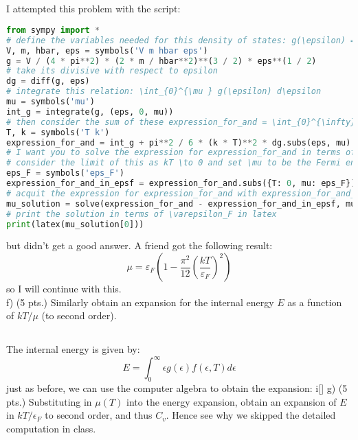 \documentclass[12pt]{article}
\begin{document}
\subsection{}
I attempted this problem with the script:
\begin{lstlisting}[language=Python]
from sympy import *
# define the variables needed for this density of states: g(\epsilon) = \frac{V}{4 \pi^2}\left(\frac{2 m}{\hbar^2}\right)^{3 / 2} \varepsilon^{1 / 2}
V, m, hbar, eps = symbols('V m hbar eps')
g = V / (4 * pi**2) * (2 * m / hbar**2)**(3 / 2) * eps**(1 / 2)
# take its divisive with respect to epsilon 
dg = diff(g, eps)
# integrate this relation: \int_{0}^{\mu } g(\epsilon) d\epsilon
mu = symbols('mu')
int_g = integrate(g, (eps, 0, mu))
# then consider the sum of these expression_for_and = \int_{0}^{\infty} g(\epsilon) f(\epsilon, T) d\epsilon = \int_{0}^{\mu } g(\epsilon) d\epsilon + \frac{\pi^2}{6} (kT)^2 g^{\prime}(\mu) + \ldots
T, k = symbols('T k')
expression_for_and = int_g + pi**2 / 6 * (k * T)**2 * dg.subs(eps, mu)
# I want you to solve the expression for expression_for_and in terms of \mu
# consider the limit of this as kT \to 0 and set \mu to be the Fermi energy \varepsilon_F
eps_F = symbols('eps_F')
expression_for_and_in_epsf = expression_for_and.subs({T: 0, mu: eps_F})
# acquit the expression for expression_for_and with expression_for_and_in_epsf and solve for \mu
mu_solution = solve(expression_for_and - expression_for_and_in_epsf, mu)
# print the solution in terms of \varepsilon_F in latex
print(latex(mu_solution[0]))
\end{lstlisting}
but didn't get a good answer. A friend got the following result:
\begin{equation}
  \mu = \varepsilon_F \left( 1 - \frac{\pi^2}{12} \left(\frac{kT}{\varepsilon_F}\right)^2 \right)
\end{equation}
so I will continue with this.\\
f) (5 pts.) Similarly obtain an expansion for the internal energy $E$ as a function of $k T / \mu$ (to second order).
\subsection{}
The internal energy is given by:
\begin{equation}
  E = \int_{0}^{\infty} \epsilon g(\epsilon) f(\epsilon, T) d\epsilon 
\end{equation}
just as before, we can use the computer algebra to obtain the expansion:
i[]
g) (5 pts.) Substituting in $\mu(T)$ into the energy expansion, obtain an expansion of $E$ in $k T / \epsilon_{F}$ to second order, and thus $C_{v}$. Hence see why we skipped the detailed computation in class.
\end{document}
